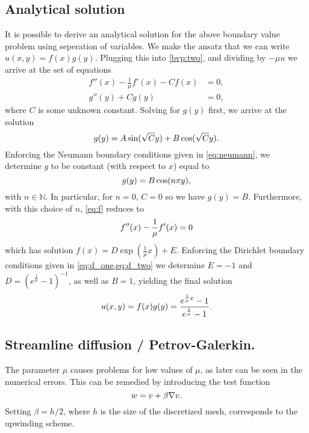 \documentclass[]{article}
\begin{document}
\subsection*{Analytical solution}
\label{sec:analytical_solution}

It is possible to derive an analytical solution for the above boundary value
problem using seperation of variables. We make the ansatz that we can write
$u(x, y) = f(x)g(y)$. Plugging this into \cref{bvp:two}, and dividing by $-\mu
u$ we arrive at the set of equations
\begin{align}
    f''(x) - \frac{1}{\mu}f'(x) - Cf(x) &= 0, \label{eq:f}\\
    g''(y) + Cg(y) &= 0,
\end{align}
where $C$ is some unknown constant. Solving for $g(y)$ first, we arrive at
the solution
\begin{equation}
    \notag
    g(y) = A\sin(\sqrt{C}y) + B\cos(\sqrt{C}y).
\end{equation}
Enforcing the Neumann boundary conditions given in \cref{eq:neumann}, we
determine $g$ to be constant (with respect to $x$) equal to 
\begin{equation}
    \notag
    g(y) = B\cos(n\pi y), 
\end{equation}
with $n \in \mathbb{N}$. In particular, for $n = 0$, $C = 0$ so we have $g(y) =
B$. Furthermore, with this choice of $n$, \cref{eq:f} reduces to
\begin{equation}
    \notag
    f''(x) - \frac{1}{\mu}f'(x) = 0
\end{equation}
which has solution $ f(x) = D \exp(\frac{1}{\mu}x) + E$.  Enforcing the Dirichlet
boundary conditions given in \cref{eq:d_one,eq:d_two} we determine $E = -1$ and
$D = (e^{\frac{1}{\mu}} - 1)^{-1}$, as well as $B = 1$, yielding the final
solution
\begin{equation}
    \notag
    u(x, y) = f(x)g(y) = \frac{e^{\frac{1}{\mu}x} - 1}{e^{\frac{1}{\mu}} - 1}.
\end{equation}

\subsection*{Streamline diffusion / Petrov-Galerkin.}
\label{sub:streamline_diffusion_petrov_galerkin_}

The parameter $\mu$ causes problems for low values of $\mu$, as later can be
seen in the numerical errors. This can be remedied by introducing the test
function
\begin{equation}
    \notag
    w = v + \beta \nabla v.
\end{equation}
Setting $\beta = h / 2$, where $h$ is the size of the discretized mesh,
corresponds to the upwinding scheme.
\end{document}
